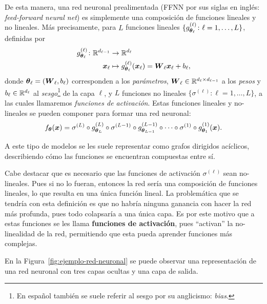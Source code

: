 {{    De esta manera, una red neuronal prealimentada (FFNN por sus siglas en inglés: \textit{feed-forward neural net}) es simplemente una composición de funciones lineales y no lineales. Más precisamente, para $L$ funciones lineales $\{ g^{(\ell)}_{\vb*{\theta}_\ell} \colon \ell = 1, \ldots, L \}$, definidas por
    \begin{align*}
        g^{(\ell)}_{\vb*{\theta}_\ell} \colon \mathbb{R}^{d_{\ell-1}} & \to \mathbb{R}^{d_\ell}                                                        \\
        \vb*{x}_\ell                                      & \mapsto g^{(\ell)}_{\vb*{\theta}_\ell}(\vb*{x}_\ell) = \vb*{W}_\ell \vb*{x}_\ell + b_\ell,
    \end{align*}
    donde $\vb*{\theta}_\ell = (\vb*{W}_\ell, b_\ell)$ corresponden a los \textit{parámetros}, $\vb*{W}_\ell \in \mathbb{R}^{d_{\ell} \times d_{\ell-1}}$ a los \emph{pesos} y $b_\ell \in \mathbb{R}^{d_\ell}$ al \emph{sesgo}\footnote{En español también se suele referir al sesgo por su anglicismo: \textit{bias}.} de la capa $\ell$, y $L$ funciones no lineales $\{ \sigma^{(\ell)} \colon \ell = 1, \ldots, L \}$, a las cuales llamaremos \emph{funciones de activación}. Estas funciones lineales y no-lineales se pueden componer para formar una red neuronal:
    \begin{equation}
        f_{\vb*{\theta}}(\vb*{x}) = \sigma^{(L)} \circ g^{(L)}_{\vb*{\theta}_L} \circ \sigma^{(L-1)} \circ g^{(L-1)}_{\vb*{\theta}_{L-1}} \circ \cdots \circ \sigma^{(1)} \circ g^{(1)}_{\vb*{\theta}_{1}}(\vb*{x}).
    \end{equation}

    A este tipo de modelos se les suele representar como grafos dirigidos acíclicos, describiendo cómo las funciones se encuentran compuestas entre sí.

    \begin{remark}
        Cabe destacar que es necesario que las funciones de activación $\sigma^{(\ell)}$ sean no-lineales. Pues si no lo fueran, entonces la red sería una composición de funciones lineales, lo que resulta en una única función lineal. La problemática que se tendría con esta definición es que no habría ninguna ganancia con hacer la red más profunda, pues todo colapsaría a una única capa. Es por este motivo que a estas funciones se les llama \textbf{funciones de activación}, pues ``activan'' la no-linealidad de la red, permitiendo que esta pueda aprender funciones más complejas.
    \end{remark}


    \begin{example}\label{ex:ejemplo-red-neuronal}
        En la Figura~\ref{fig:ejemplo-red-neuronal} se puede observar una representación de una red neuronal con tres capas ocultas y una capa de salida.


\end{example}}}
